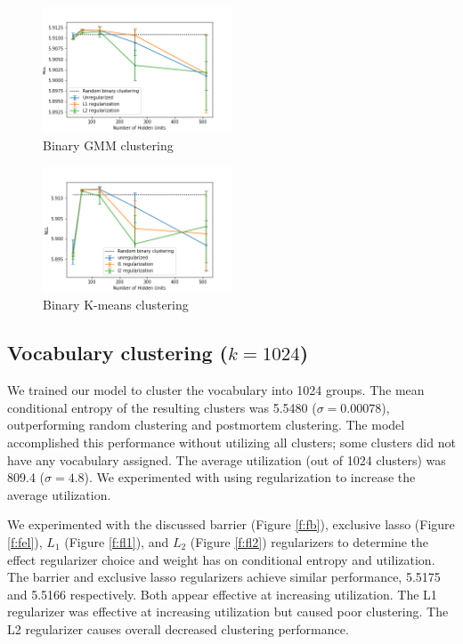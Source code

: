\documentclass[11pt,letterpaper]{article}
\begin{document}
\begin{figure}
  \caption{Binary GMM clustering}
\label{f:bgmm}
  \centering
    \includegraphics[width=0.5\textwidth]{binary_gmm.png}
\end{figure}

\begin{figure}
  \caption{Binary K-means clustering}
\label{f:bkm}
  \centering
    \includegraphics[width=0.5\textwidth]{binary_km.png}
\end{figure}

\subsection{Vocabulary clustering ($k=1024$)}

We trained our model to cluster the vocabulary into 1024 groups. The mean conditional entropy of the resulting clusters was 5.5480 ($\sigma=0.00078$), outperforming random clustering and postmortem clustering. The model accomplished this performance without utilizing all clusters; some clusters did not have any vocabulary assigned. The average utilization (out of 1024 clusters) was 809.4 ($\sigma=4.8$). We experimented with using regularization to increase the average utilization.

We experimented with the discussed barrier (Figure \ref{f:fb}), exclusive lasso (Figure \ref{f:fel}), $L_1$ (Figure \ref{f:fl1}), and $L_2$ (Figure \ref{f:fl2}) regularizers to determine the effect regularizer choice and weight has on conditional entropy and utilization. The barrier and exclusive lasso regularizers achieve similar performance, 5.5175 and 5.5166 respectively. Both appear effective at increasing utilization. The L1 regularizer was effective at increasing utilization but caused poor clustering. The L2 regularizer causes overall decreased clustering performance.
\end{document}
